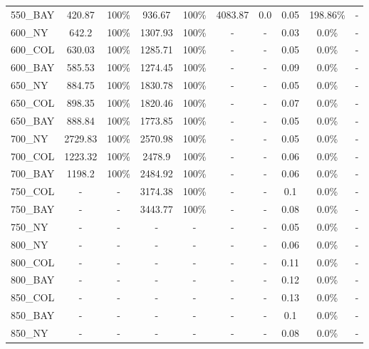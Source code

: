 \documentclass[main.tex]{subfiles}
\begin{document}
\begin{center}
\begin{tabular}{lccccccccc}
550\_BAY & 420.87 &  100\%  & 936.67 &  100\%  & 4083.87 & 0.0 & 0.05 & 198.86\% & - \\
600\_NY & 642.2 &  100\%  & 1307.93 &  100\%  & - & - 
 & 0.03 & 0.0\% & - \\
600\_COL & 630.03 &  100\%  & 1285.71 &  100\%  & - & - 
 & 0.05 & 0.0\% & - \\
600\_BAY & 585.53 &  100\%  & 1274.45 &  100\%  & - & - 
 & 0.09 & 0.0\% & - \\
650\_NY & 884.75 &  100\%  & 1830.78 &  100\%  & - & - 
 & 0.05 & 0.0\% & - \\
650\_COL & 898.35 &  100\%  & 1820.46 &  100\%  & - & - 
 & 0.07 & 0.0\% & - \\
650\_BAY & 888.84 &  100\%  & 1773.85 &  100\%  & - & - 
 & 0.05 & 0.0\% & - \\
700\_NY & 2729.83 &  100\%  & 2570.98 &  100\%  & - & - 
 & 0.05 & 0.0\% & - \\
700\_COL & 1223.32 &  100\%  & 2478.9 &  100\%  & - & - 
 & 0.06 & 0.0\% & - \\
700\_BAY & 1198.2 &  100\%  & 2484.92 &  100\%  & - & - 
 & 0.06 & 0.0\% & - \\
750\_COL & - & - 
 & 3174.38 &  100\%  & - & - 
 & 0.1 & 0.0\% & - \\
750\_BAY & - & - 
 & 3443.77 &  100\%  & - & - 
 & 0.08 & 0.0\% & - \\
750\_NY & - & - 
 & - & - 
 & - & - 
 & 0.05 & 0.0\% & - \\
800\_NY & - & - 
 & - & - 
 & - & - 
 & 0.06 & 0.0\% & - \\
800\_COL & - & - 
 & - & - 
 & - & - 
 & 0.11 & 0.0\% & - \\
800\_BAY & - & - 
 & - & - 
 & - & - 
 & 0.12 & 0.0\% & - \\
850\_COL & - & - 
 & - & - 
 & - & - 
 & 0.13 & 0.0\% & - \\
850\_BAY & - & - 
 & - & - 
 & - & - 
 & 0.1 & 0.0\% & - \\
850\_NY & - & - 
 & - & - 
 & - & - 
 & 0.08 & 0.0\% & - \\
\hline\end{tabular}
\end{center}
\newpage
\end{document}
